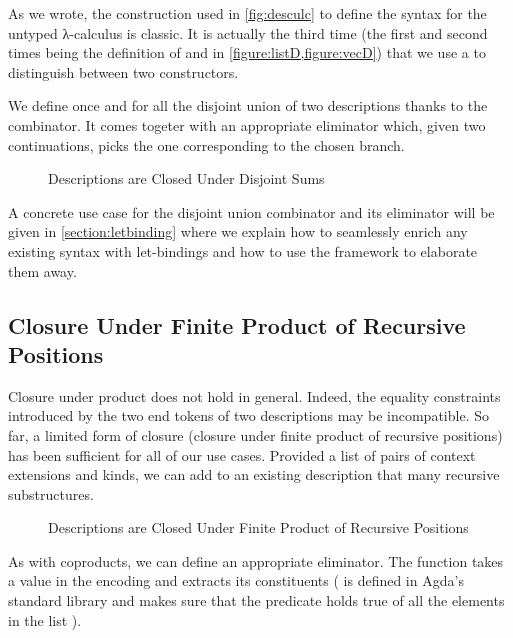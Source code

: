 As we wrote, the construction used in \cref{fig:desculc} to define the
syntax for the untyped λ-calculus is classic. It is actually the third
time (the first and second times being the definition of  and
 in \cref{figure:listD,figure:vecD}) that we use a 
to distinguish between two constructors.

We define once and for all the disjoint union of two descriptions thanks
to the  combinator. It comes togeter with an appropriate
eliminator  which, given two continuations, picks the one
corresponding to the chosen branch.

\begin{figure}[h]
\caption{Descriptions are Closed Under Disjoint Sums\label{figure:descsum}}
\end{figure}

A concrete use case for the disjoint union combinator and its eliminator
will be given in \cref{section:letbinding} where we explain how to seamlessly
enrich any existing syntax with let-bindings and how to use the 
framework to elaborate them away.

\subsection{Closure Under Finite Product of Recursive Positions}

Closure under product does not hold in general. Indeed, the equality constraints
introduced by the two end tokens of two descriptions may be incompatible. So far,
a limited form of closure (closure under finite product of recursive positions)
has been sufficient for all of our use cases. Provided a list of pairs of context
extensions and kinds, we can add to an existing description that many recursive
substructures.

\begin{figure}[h]
\caption{Descriptions are Closed Under Finite Product of Recursive Positions\label{figure:descprod}}
\end{figure}

As with coproducts, we can define an appropriate eliminator. The function 
takes a value in the encoding and extracts its constituents ({  }
is defined in Agda's standard library and makes sure that the predicate  holds
true of all the elements in the list ).

